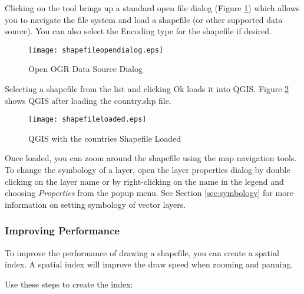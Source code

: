 Clicking on the tool brings up a standard open file dialog (Figure
\ref{fig:openshapefile}) which allows you to navigate the file system and load
a shapefile (or other supported data source).  You can also select the
Encoding type for the shapefile if desired.

\begin{figure}[h]
   \begin{center}
   \caption{Open OGR Data Source Dialog}\label{fig:openshapefile}\smallskip
   \texttt{[image: shapefileopendialog.eps]}
\end{center} 
\end{figure}

Selecting a shapefile from the list and clicking Ok loads it into QGIS. Figure
\ref{fig:loadedshapefile} shows QGIS after loading the country.shp file.

\begin{figure}[ht]
   \begin{center}
   \caption{QGIS with the countries Shapefile
Loaded}\label{fig:loadedshapefile}\smallskip
   \texttt{[image: shapefileloaded.eps]}
\end{center} 
\end{figure}

\begin{Tip}\caption{\textsc{Layer Colors}}
\end{Tip}

Once loaded, you can zoom around the shapefile using the map navigation tools.
To change the symbology of a layer, open the layer properties dialog by double
clicking on the layer name or by right-clicking on the name in the legend and
choosing \textsl{Properties} from the popup menu. See
Section \ref{sec:symbology} for more information on setting symbology of
vector layers.
  
\subsubsection{Improving Performance}

To improve the performance of drawing a shapefile, you can create a spatial
index. A  spatial index will improve the draw
speed when
zooming and panning.  

Use these steps to create the index:

